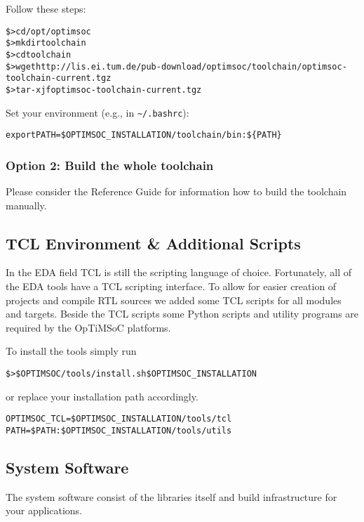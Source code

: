 Follow these steps:

\begin{alltt}
\$> cd /opt/optimsoc
\$> mkdir toolchain
\$> cd toolchain
\$> wget http://lis.ei.tum.de/pub-download/optimsoc/toolchain/optimsoc-toolchain-current.tgz
\$> tar -xjf optimsoc-toolchain-current.tgz
\end{alltt}

Set your environment (e.g., in \verb|~/.bashrc|):

\begin{alltt}
export PATH=\$OPTIMSOC_INSTALLATION/toolchain/bin:\$\{PATH\}
\end{alltt}

\subsubsection{Option 2: Build the whole toolchain}

Please consider the Reference Guide for information how to build the
toolchain manually.

\subsection{TCL Environment \& Additional Scripts}

In the EDA field TCL is still the scripting language of choice.
Fortunately, all of the EDA tools have a TCL scripting interface. To
allow for easier creation of projects and compile RTL sources we added
some TCL scripts for all modules and targets. Beside the TCL scripts
some Python scripts and utility programs are required by the OpTiMSoC
platforms.

To install the tools simply run

\begin{alltt}
\$> \$OPTIMSOC/tools/install.sh \$OPTIMSOC_INSTALLATION
\end{alltt}

or replace your installation path accordingly.

\begin{alltt}
OPTIMSOC_TCL=\$OPTIMSOC_INSTALLATION/tools/tcl
PATH=\$PATH:\$OPTIMSOC_INSTALLATION/tools/utils
\end{alltt}

\subsection{System Software}

The system software consist of the libraries itself and build
infrastructure for your applications.

